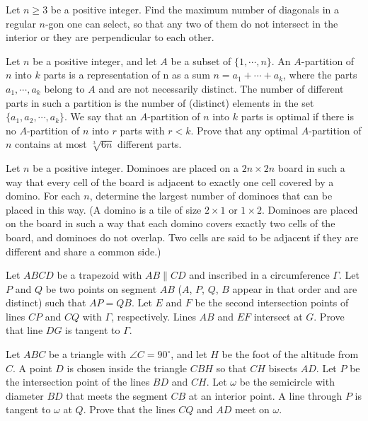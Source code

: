 \documentclass[11pt]{scrartcl}
\begin{document}
\begin{problem}[218743543617334]
	Let $n \geq 3$ be a positive integer. Find the maximum number of diagonals in a regular $n$-gon one can select, so that any two of them do not intersect in the interior or they are perpendicular to each other.
\end{problem}
\begin{problem}[7503515175847762748]
Let $n$ be a positive integer, and let $A$ be a subset of $\{ 1,\cdots ,n\}$. An $A$-partition of $n$ into $k$ parts is a representation of n as a sum $n = a_1 + \cdots + a_k$, where the parts $a_1 , \cdots , a_k $ belong to $A$ and are not necessarily distinct. The number of different parts in such a partition is the number of (distinct) elements in the set $\{ a_1 , a_2 , \cdots , a_k \} $.
We say that an $A$-partition of $n$ into $k$ parts is optimal if there is no $A$-partition of $n$ into $r$ parts with $r<k$. Prove that any optimal $A$-partition of $n$ contains at most $\sqrt[3]{6n}$ different parts.
\end{problem}
\begin{problem}[406431313842688]
Let $n$ be a positive integer. Dominoes are placed on a $2n \times 2n$ board in such a way that every cell of the board is adjacent to exactly one cell covered by a domino. For each $n$, determine the largest number of dominoes that can be placed in this way.
(A domino is a tile of size $2 \times 1$ or $1 \times 2$. Dominoes are placed on the board in such a way that each domino covers exactly two cells of the board, and dominoes do not overlap. Two cells are said to be adjacent if they are different and share a common side.)
\end{problem}
\begin{problem}[634298954927697]
Let $ABCD$ be a trapezoid with $AB\parallel CD$ and inscribed in a circumference $\Gamma$. Let $P$ and $Q$ be two points on segment $AB$ ($A$, $P$, $Q$, $B$ appear in that order and are distinct) such that $AP=QB$. Let $E$ and $F$ be the second intersection points of lines $CP$ and $CQ$ with $\Gamma$, respectively. Lines $AB$ and $EF$ intersect at $G$. Prove that line $DG$ is tangent to $\Gamma$.
\end{problem}
\begin{problem}[4582918044793570936]
Let $ABC$ be a triangle with $\angle{C} = 90^{\circ}$, and let $H$ be the foot of the altitude from $C$. A point $D$ is chosen inside the triangle $CBH$ so that $CH$ bisects $AD$. Let $P$ be the intersection point of the lines $BD$ and $CH$. Let $\omega$ be the semicircle with diameter $BD$ that meets the segment $CB$ at an interior point. A line through $P$ is tangent to $\omega$ at $Q$. Prove that the lines $CQ$ and $AD$ meet on $\omega$.
\end{problem}
\end{document}
